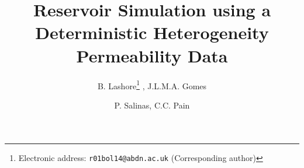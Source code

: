 \documentclass{article}
\begin{document}
\title{Reservoir Simulation using a Deterministic Heterogeneity Permeability Data}


\author{B. Lashore\thanks{Electronic address: \texttt{r01bol14@abdn.ac.uk} (Corresponding author)} , J.L.M.A. Gomes}

\author{P. Salinas, C.C. Pain}

\end{document}
